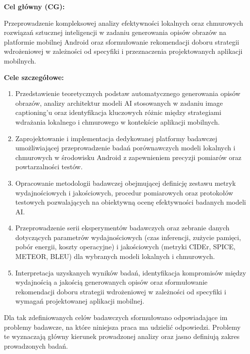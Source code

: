 \vspace{0.3cm}
\noindent
\textbf{Cel główny (CG):} 

Przeprowadzenie kompleksowej analizy efektywności lokalnych oraz chmurowych rozwiązań sztucznej 
inteligencji w zadaniu generowania opisów obrazów na platformie mobilnej Android 
oraz sformułowanie rekomendacji doboru strategii wdrożeniowej w zależności od specyfiki i przeznaczenia 
projektowanych aplikacji mobilnych.

\vspace{0.3cm}
\noindent
\textbf{Cele szczegółowe:}

\begin{enumerate}[leftmargin=*, label=\textbf{C\arabic*.}, itemsep=3pt]
    \item Przedstawienie teoretycznych podstaw automatycznego generowania opisów obrazów, analizy 
    architektur modeli AI stosowanych w zadaniu image captioning'u oraz identyfikacja kluczowych różnic 
    między strategiami wdrażania lokalnego i chmurowego w kontekście aplikacji mobilnych.
    
    \item Zaprojektowanie i implementacja dedykowanej platformy badawczej  umożliwiającej 
    przeprowadzenie badań porównawczych modeli lokalnych i chmurowych w środowisku Android z zapewnieniem 
    precyzji pomiarów oraz powtarzalności testów.
    
    \item Opracowanie metodologii badawczej obejmującej definicję zestawu metryk wydajnościowych i jakościowych, 
    procedur pomiarowych oraz protokołów testowych pozwalających na obiektywną ocenę efektywności badanych 
    modeli AI.
    
    \item Przeprowadzenie serii eksperymentów badawczych oraz zebranie danych dotyczących parametrów wydajnościowych 
    (czas inferencji, zużycie pamięci, pobór energii, koszty operacyjne) i jakościowych (metryki CIDEr, SPICE, 
    METEOR, BLEU) dla wybranych modeli lokalnych i chmurowych.
    
    \item Interpretacja uzyskanych wyników badań, identyfikacja kompromisów między wydajnością a jakością 
    generowanych opisów oraz sformułowanie rekomendacji doboru strategii wdrożeniowej w zależności od 
    specyfiki i wymagań projektowanej aplikacji mobilnej.
\end{enumerate}

\noindent
Dla tak zdefiniowanych celów badawczych sformułowano odpowiadające im problemy badawcze,
na które niniejsza praca ma udzielić odpowiedzi. Problemy te wyznaczają główny kierunek prowadzonej
analizy oraz jasno definiują zakres prowadzonych badań.

